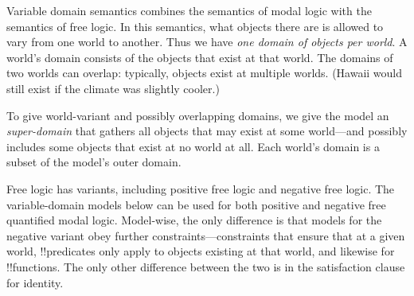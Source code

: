 \documentclass[../../../include/open-logic-section]{subfiles}
\begin{document}


\begin{explain}
Variable domain semantics combines the semantics of modal logic 
with the semantics of free logic. In this semantics, what objects
there are is allowed to vary from one world to another. Thus we have
\emph{one domain of objects per world}. A world's domain consists 
of the objects that exist at that world. The domains of two worlds
can overlap: typically, objects exist at multiple worlds. 
(Hawaii would still exist if the climate was slightly 
cooler.) 

To give world-variant and possibly overlapping domains, 
we give the model an \emph{super-domain} that gathers all 
objects that may exist at some world---and possibly includes 
some objects that exist at no world at all. Each world's domain is a 
subset of the model's outer domain.

Free logic has variants, including positive free logic
 and negative free logic. The variable-domain models
 below can be used for both positive and 
 negative free quantified modal logic. Model-wise, the only 
 difference is that models for the negative variant
 obey further constraints---constraints that ensure 
 that at a given world, !!{predicate}s only apply to objects
 existing at that world, and likewise for !!{function}s. 
 The only other difference between the two is in the 
 satisfaction clause for identity. 
\end{explain}
\end{document}
